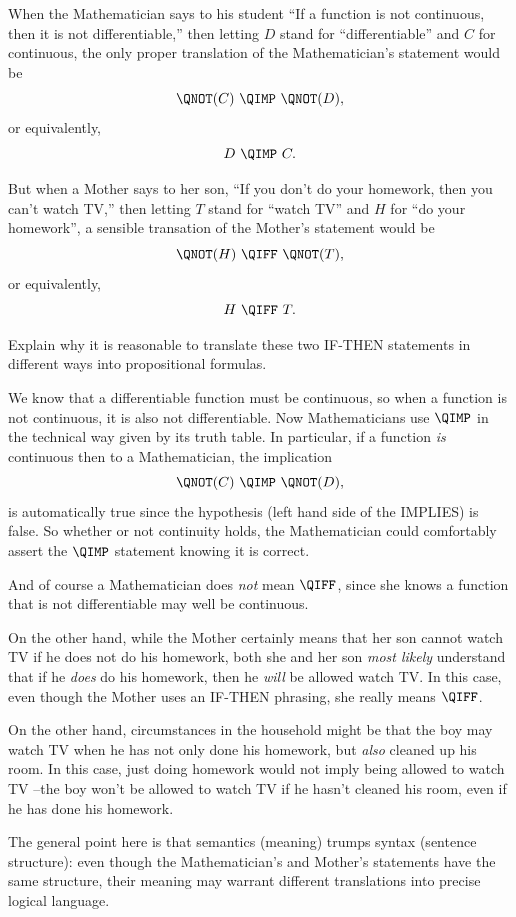 \documentclass[handout]{mcs}
\begin{document}
\begin{problem}
When the Mathematician says to his student ``If a function is not
continuous, then it is not differentiable,'' then letting $D$ stand for
``differentiable'' and $C$ for continuous, the only proper translation of the
Mathematician's statement would be
\[
\QNOT(C)\ \QIMP\ \QNOT(D),
\]
or equivalently,
\[
D\ \QIMP\ C.
\]

But when a Mother says to her son, ``If you don't do your homework, then
you can't watch TV,'' then letting $T$ stand for ``watch TV'' and $H$ for
``do your homework'', a sensible transation of the Mother's statement would
be
\[
\QNOT(H)\ \QIFF\ \QNOT(T),
\]
or equivalently,
\[
H\ \QIFF\ T.
\]

Explain why it is reasonable to translate these two IF-THEN statements in
different ways into propositional formulas.

\begin{solution}
We know that a differentiable function must be continuous, so
  when a function is not continuous, it is also not differentiable.  Now
  Mathematicians use $\QIMP$ in the technical way given by its truth table.
  In particular, if a function \emph{is} continuous then to a
  Mathematician, the implication
\[
\QNOT(C)\ \QIMP\ \QNOT(D),
\]
is automatically true since the hypothesis (left hand side of the IMPLIES)
is false.  So whether or not continuity holds, the Mathematician could
comfortably assert the $\QIMP$ statement knowing it is correct.

And of course a Mathematician does \emph{not} mean $\QIFF$, since she
knows a function that is not differentiable may well be continuous.

On the other hand, while the Mother certainly means that her son cannot
watch TV if he does not do his homework, both she and her son \emph{most
  likely} understand that if he \emph{does} do his homework, then he
\emph{will} be allowed watch TV.  In this case, even though the Mother
uses an IF-THEN phrasing, she really means $\QIFF$.

On the other hand, circumstances in the household might be that the boy may
watch TV when he has not only done his homework, but \emph{also} cleaned up
his room.  In this case, just doing homework would not imply being allowed
to watch TV --the boy won't be allowed to watch TV if he hasn't cleaned his
room, even if he has done his homework.

The general point here is that semantics (meaning) trumps syntax (sentence
structure): even though the Mathematician's and Mother's statements have
the same structure, their meaning may warrant different translations into
precise logical language.

\end{solution}

\end{problem}
\end{document}
